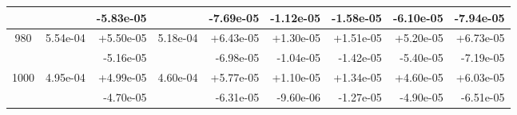 \begin{tabular}{|c|r|r|r|r|r|r|r|r|}
 & & -5.83e-05 & & -7.69e-05 & -1.12e-05 & -1.58e-05 & -6.10e-05 & -7.94e-05 \\
\hline
980 & 5.54e-04 & +5.50e-05 & 5.18e-04 & +6.43e-05 & +1.30e-05 & +1.51e-05 & +5.20e-05 & +6.73e-05\\
 & & -5.16e-05 & & -6.98e-05 & -1.04e-05 & -1.42e-05 & -5.40e-05 & -7.19e-05 \\
\hline
1000 & 4.95e-04 & +4.99e-05 & 4.60e-04 & +5.77e-05 & +1.10e-05 & +1.34e-05 & +4.60e-05 & +6.03e-05\\
 & & -4.70e-05 & & -6.31e-05 & -9.60e-06 & -1.27e-05 & -4.90e-05 & -6.51e-05 \\
\hline
\end{tabular}
